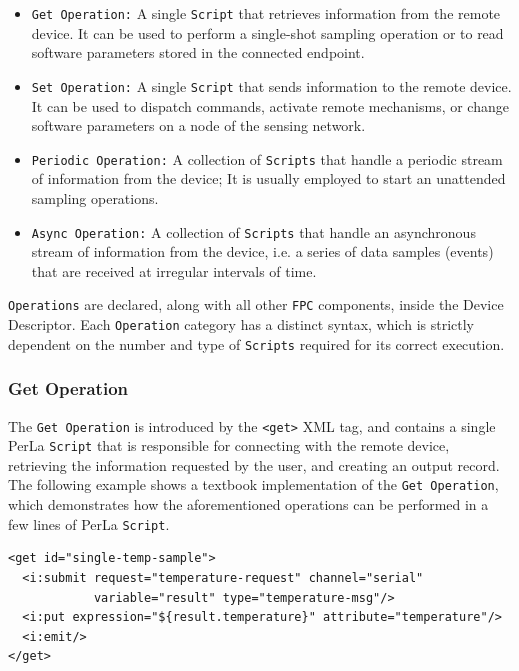 \begin{itemize}

    \item \texttt{Get Operation:} A single \texttt{Script} that retrieves
        information from the remote device. It can be used to perform a
        single-shot sampling operation or to read software parameters stored in
        the connected endpoint.

    \item \texttt{Set Operation:} A single \texttt{Script} that sends
        information to the remote device. It can be used to dispatch commands,
        activate remote mechanisms, or change software parameters on a node of
        the sensing network.

    \item \texttt{Periodic Operation:} A collection of \texttt{Scripts} that
        handle a periodic stream of information from the device; It is usually
        employed to start an unattended sampling operations.

    \item \texttt{Async Operation:} A collection of \texttt{Scripts} that
        handle an asynchronous stream of information from the device, i.e. a
        series of data samples (events) that are received at irregular
        intervals of time.

\end{itemize}

\texttt{Operations} are declared, along with all other \texttt{FPC} components,
inside the Device Descriptor. Each \texttt{Operation} category has a distinct
syntax, which is strictly dependent on the number and type of \texttt{Scripts}
required for its correct execution. 

\subsubsection{Get Operation}

The \texttt{Get Operation} is introduced by the \lstinline!<get>! XML tag, and
contains a single PerLa \texttt{Script} that is responsible for connecting with
the remote device, retrieving the information requested by the user, and
creating an output record. The following example shows a textbook
implementation of the \texttt{Get Operation}, which demonstrates how the
aforementioned operations can be performed in a few lines of PerLa
\texttt{Script}.

\lstset{language=XML}
\begin{lstlisting}
<get id="single-temp-sample">
  <i:submit request="temperature-request" channel="serial"
            variable="result" type="temperature-msg"/>
  <i:put expression="${result.temperature}" attribute="temperature"/>
  <i:emit/>
</get>
\end{lstlisting}

